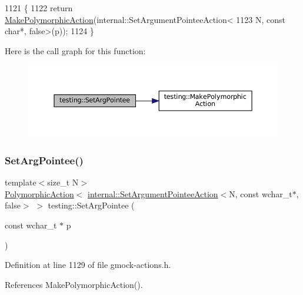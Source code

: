 \begin{DoxyCode}
1121                              \{
1122   \textcolor{keywordflow}{return} \hyperlink{namespacetesting_a36bd06c5ea972c6df0bd9f40a7a94c65}{MakePolymorphicAction}(internal::SetArgumentPointeeAction<
1123       N, \textcolor{keyword}{const} \textcolor{keywordtype}{char}*, \textcolor{keyword}{false}>(p));
1124 \}
\end{DoxyCode}
Here is the call graph for this function\+:
\nopagebreak
\begin{figure}[H]
\begin{center}
\leavevmode
\includegraphics[width=350pt]{namespacetesting_a4a190fd2d02fb7cd79c5b3df3f80b647_cgraph}
\end{center}
\end{figure}
\mbox{\label{namespacetesting_ac128085b4a8d64563fd5ccef324ea177}} 
\subsubsection{\texorpdfstring{Set\+Arg\+Pointee()}{SetArgPointee()}\hspace{0.1cm}{\footnotesize\ttfamily [3/3]}}
{\footnotesize\ttfamily template$<$size\+\_\+t N$>$ \\
\hyperlink{classtesting_1_1PolymorphicAction}{Polymorphic\+Action}$<$ \hyperlink{classtesting_1_1internal_1_1SetArgumentPointeeAction}{internal\+::\+Set\+Argument\+Pointee\+Action}$<$N, const wchar\+\_\+t$\ast$, false$>$ $>$ testing\+::\+Set\+Arg\+Pointee (\begin{DoxyParamCaption}\item[{const wchar\+\_\+t $\ast$}]{p }\end{DoxyParamCaption})}



Definition at line 1129 of file gmock-\/actions.\+h.



References Make\+Polymorphic\+Action().



